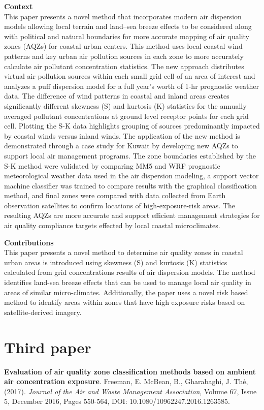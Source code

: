 \vspace{5mm}
\noindent
\textbf{Context}\\
\noindent
This paper presents a novel method that incorporates modern air dispersion models allowing local terrain and land–sea breeze effects to be considered along with political and natural boundaries for more accurate mapping of air quality zones (AQZs) for coastal urban centers. This method uses local coastal wind patterns and key urban air pollution sources in each zone to more accurately calculate air pollutant concentration statistics. The new approach distributes virtual air pollution sources within each small grid cell of an area of interest and analyzes a puff dispersion model for a full year’s worth of 1-hr prognostic weather data. The difference of wind patterns in coastal and inland areas creates significantly different skewness (S) and kurtosis (K) statistics for the annually averaged pollutant concentrations at ground level receptor points for each grid cell. Plotting the S-K data highlights grouping of sources predominantly impacted by coastal winds versus inland winds. The application of the new method is demonstrated through a case study for Kuwait by developing new AQZs to support local air management programs. The zone boundaries established by the S-K method were validated by comparing MM5 and WRF prognostic meteorological weather data used in the air dispersion modeling, a support vector machine classifier was trained to compare results with the graphical classification method, and final zones were compared with data collected from Earth observation satellites to confirm locations of high-exposure-risk areas. The resulting AQZs are more accurate and support efficient management strategies for air quality compliance targets effected by local coastal microclimates.

\vspace{5mm}
\noindent
\textbf{Contributions}\\
\noindent
This paper presents a novel method to determine air quality zones in coastal urban areas is introduced using skewness (S) and kurtosis (K) statistics calculated from grid concentrations results of air dispersion models.  The method identifies land-sea breeze effects that can be used to manage local air quality in areas of similar micro-climates. Additionally, the paper uses a novel risk based method to identify areas within zones that have high exposure risks based on satellite-derived imagery.

\section{Third paper}
\noindent
\textbf{Evaluation of air quality zone classification methods based on ambient air concentration exposure}. Freeman, E. McBean, B., Gharabaghi, J.  Th\'e, (2017). \textit{Journal of the Air and Waste Management Association}, Volume 67, Issue 5, December 2016, Pages 550-564, DOI: 10.1080/10962247.2016.1263585.

